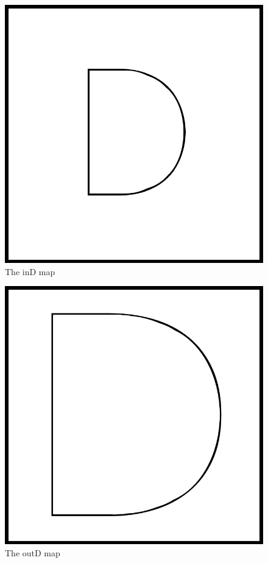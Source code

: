 \documentclass[10pt,journal,compsoc]{IEEEtran}
\begin{document}
      \begin{figure}[thpb]
      \centering
     \includegraphics[scale=0.2]{img/inD.png}
      \caption{The inD map}
      \label{fig:inD_map}
   \end{figure}
   
   \begin{figure}[thpb]
      \centering
     \includegraphics[scale=0.2]{img/outD.png}
      \caption{The outD map}
      \label{fig:outD_map}
   \end{figure}
\end{document}
